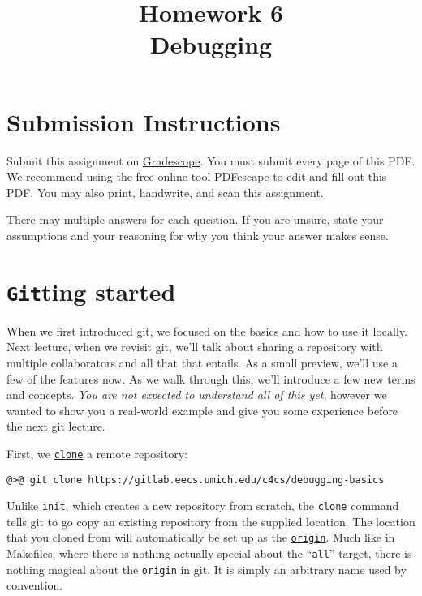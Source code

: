 \documentclass{article}
\begin{document}
\fancyfoot[C]{\color{gray} \thepage~/~\pageref*{LastPage}}
\pagestyle{fancyplain}



\title{\textbf{Homework 6\\Debugging}}
\author{\textbf{\color{red}{Due: Saturday, October 22, 10:00PM (Hard Deadline)}}}
\date{}
\maketitle


\section*{Submission Instructions}
Submit this assignment on \href{https://gradescope.com/courses/2248}{Gradescope}.
You must submit every page of this PDF.
We recommend using the free online tool \href{https://www.pdfescape.com}{PDFescape}
to edit and fill out this PDF.
You may also print, handwrite, and scan this assignment.

There may multiple answers for each question. If you are unsure,
state your assumptions and your reasoning for why you think your answer
makes sense.


\newpage
\section{\texttt{Git}ting started}

When we first introduced git, we focused on the basics and how to use it
locally. Next lecture, when we revisit git, we'll talk about sharing a
repository with multiple collaborators and all that that entails. As a small
preview, we'll use a few of the features now. As we walk through this, we'll
introduce a few new terms and concepts. \emph{You are not expected to
understand all of this yet}, however we wanted to show you a real-world
example and give you some experience before the next git lecture.

First, we \texttt{\ul{clone}} a remote repository:

\begin{lstlisting}
@>@ git clone https://gitlab.eecs.umich.edu/c4cs/debugging-basics
\end{lstlisting}

Unlike \texttt{init}, which creates a new repository from scratch, the
\texttt{clone} command tells git to go copy an existing repository from the
supplied location. The location that you cloned from will automatically be set
up as the \texttt{\ul{\mbox{origin}}}. Much like in Makefiles, where there is
nothing actually special about the ``\texttt{all}'' target, there is nothing
magical about the \texttt{origin} in git. It is simply an arbitrary name used
by convention.
\end{document}
